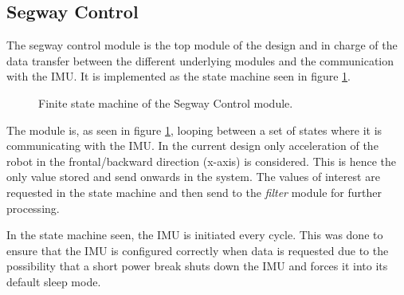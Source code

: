 \subsection{Segway Control}
The segway control module is the top module of the design and in charge of the data transfer between the different underlying modules and the communication with the IMU.
It is implemented as the state machine seen in figure \ref{fig:segwaycontrol_fsm}.


\begin{figure}[H]
\centering


\caption{Finite state machine of the Segway Control module.}
\label{fig:segwaycontrol_fsm}
\end{figure}

The module is, as seen in figure \ref{fig:segwaycontrol_fsm}, looping between a set of states where it is communicating with the IMU.
In the current design only acceleration of the robot in the frontal/backward direction (x-axis) is considered.
This is hence the only value stored and send onwards in the system.
The values of interest are requested in the state machine and then send to the \textit{filter} module for further processing.

In the state machine seen, the IMU is initiated every cycle.
This was done to ensure that the IMU is configured correctly when data is requested due to the possibility that a short power break shuts down the IMU and forces it into its default sleep mode.

